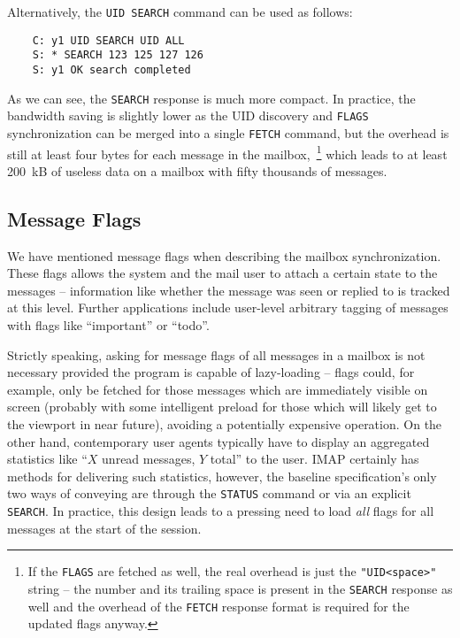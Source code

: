 \documentclass[trojita]{subfiles}
\begin{document}
Alternatively, the {\tt UID SEARCH} command can be used as follows:

\begin{verbatim}
    C: y1 UID SEARCH UID ALL
    S: * SEARCH 123 125 127 126
    S: y1 OK search completed
\end{verbatim}

As we can see, the {\tt SEARCH} response is much more compact.  In practice, the bandwidth saving is slightly lower as
the UID discovery and {\tt FLAGS} synchronization can be merged into a single {\tt FETCH} command, but the overhead is
still at least four bytes for each message in the mailbox,~\footnote{If the {\tt FLAGS} are fetched as well, the real
overhead is just the {\tt "UID<space>"} string -- the number and its trailing space is present in the {\tt SEARCH}
response as well and the overhead of the {\tt FETCH} response format is required for the updated flags anyway.} which
leads to at least 200~kB of useless data on a mailbox with fifty thousands of messages.

\subsection{Message Flags}

We have mentioned message flags when describing the mailbox synchronization.  These flags allows the system and the mail
user to attach a certain state to the messages -- information like whether the message was seen or replied to is tracked
at this level.  Further applications include user-level arbitrary tagging of messages with flags like ``important'' or
``todo''.

Strictly speaking, asking for message flags of all messages in a mailbox is not necessary provided the program is
capable of lazy-loading -- flags could, for example, only be fetched for those messages which are immediately visible on
screen (probably with some intelligent preload for those which will likely get to the viewport in near future), avoiding
a potentially expensive operation.  On the other hand, contemporary user agents typically have to display an aggregated
statistics like ``$X$ unread messages, $Y$ total'' to the user.  IMAP certainly has methods for delivering such
statistics, however, the baseline specification's only two ways of conveying are through the {\tt STATUS} command or via
an explicit {\tt SEARCH}.  In practice, this design leads to a pressing need to load {\em all} flags for all messages at
the start of the session.
\end{document}
